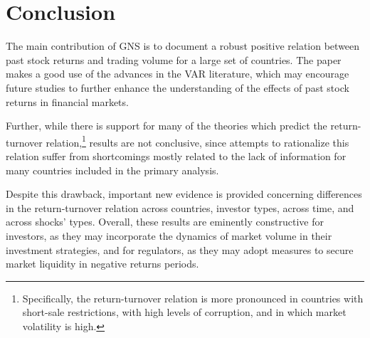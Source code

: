 \documentclass[final,3p,times,twocolumn]{elsarticle}
\begin{document}
\section{Conclusion}

The main contribution of GNS is to document a robust positive relation between past stock returns and trading volume for a large set of countries. The paper makes a good use of the advances in the VAR literature, which may encourage future studies to further enhance the understanding of the effects of past stock returns in financial markets.\par

Further, while there is support for many of the theories which predict the return-turnover relation,\footnote{Specifically, the return-turnover relation is more pronounced in countries with short-sale restrictions, with high levels of corruption, and in which market volatility is high.} results are not conclusive, since attempts to rationalize this relation suffer from shortcomings mostly related to the lack of information for many countries included in the primary analysis.\par

Despite this drawback, important new evidence is provided concerning differences in the return-turnover relation across countries, investor types, across time, and across shocks' types. Overall, these results are eminently constructive for investors, as they may incorporate the dynamics of market volume in their investment strategies, and for regulators, as they may adopt measures to secure market liquidity in negative returns periods.\par






\end{document}
